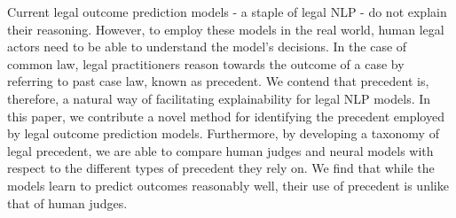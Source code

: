 Current legal outcome prediction models - a staple of legal NLP - do not explain their reasoning. However, to employ these models in the real world, human legal actors need to be able to understand the model's decisions. In the case of common law, legal practitioners reason towards the outcome of a case by referring to past case law, known as precedent. We contend that precedent is, therefore, a natural way of facilitating explainability for legal NLP models. In this paper, we contribute a novel method for identifying the precedent employed by legal outcome prediction models. Furthermore, by developing a taxonomy of legal precedent, we are able to compare human judges and neural models with respect to the different types of precedent they rely on. We find that while the models learn to predict outcomes reasonably well, their use of precedent is unlike that of human judges.
